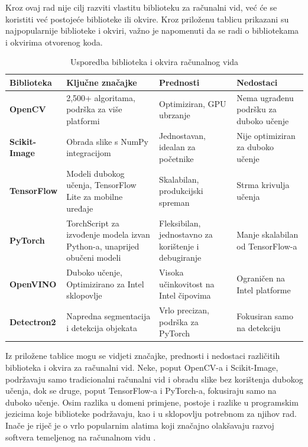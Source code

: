 \documentclass{foi}
\begin{document}
Kroz ovaj rad nije cilj razviti vlastitu biblioteku za računalni vid, već će se koristiti već postojeće biblioteke ili okvire. Kroz priloženu tablicu prikazani su najpopularnije biblioteke i okviri, važno je napomenuti da se radi o bibliotekama i okvirima otvorenog koda.

\begin{table}[htbp]
\centering
\renewcommand{\arraystretch}{1.3}
\begin{tabularx}{\textwidth}{|l|X|X|X|}
\hline
\textbf{Biblioteka} & \textbf{Ključne značajke} & \textbf{Prednosti} & \textbf{Nedostaci} \\
\hline
\textbf{OpenCV} & 2,500+ algoritama, podrška za više platformi & Optimiziran, GPU ubrzanje & Nema ugrađenu podršku za duboko učenje \\
\hline
\textbf{Scikit-Image} & Obrada slike s NumPy integracijom & Jednostavan, idealan za početnike & Nije optimiziran za duboko učenje  \\
\hline
\textbf{TensorFlow} & Modeli dubokog učenja, TensorFlow Lite za mobilne uređaje & Skalabilan, produkcijski spreman & Strma krivulja učenja \\
\hline
\textbf{PyTorch} & TorchScript za izvođenje modela izvan Python-a, unaprijed obučeni modeli & Fleksibilan, jednostavno za korištenje i debugiranje & Manje skalabilan od TensorFlow-a\\
\hline
\textbf{OpenVINO} & Duboko učenje, Optimizirano za Intel sklopovlje & Visoka učinkovitost na Intel čipovima & Ograničen na Intel platforme \\
\hline
\textbf{Detectron2} & Napredna segmentacija i detekcija objekata & Vrlo precizan, podrška za PyTorch & Fokusiran samo na detekciju \\
\hline
\end{tabularx}
\caption{Usporedba biblioteka i okvira računalnog vida \cite{Saiwa2024Nov}}
\label{tab:computer_vision_languages}
\end{table}

Iz priložene tablice mogu se vidjeti značajke, prednosti i nedostaci različitih biblioteka i okvira za računalni vid. Neke, poput OpenCV-a i Scikit-Image, podržavaju samo tradicionalni računalni vid i obradu slike bez korištenja dubokog učenja, dok se druge, poput TensorFlow-a i PyTorch-a, fokusiraju samo na duboko učenje. Osim razlika u domeni primjene, postoje i razlike u programskim jezicima koje biblioteke podržavaju, kao i u sklopovlju potrebnom za njihov rad. Inače je riječ je o vrlo popularnim alatima koji značajno olakšavaju razvoj softvera temeljenog na računalnom vidu \cite{Saiwa2024Nov}.
\end{document}
